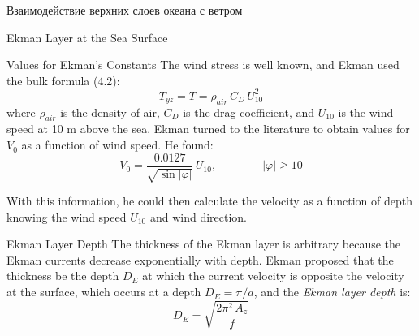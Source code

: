 \begin{chapter}{Взаимодействие верхних слоев океана с ветром}
\begin{section}{Ekman Layer at the Sea Surface}
\begin{paragraph}{Values for Ekman's Constants}
The wind stress is well known, and
Ekman used the bulk formula (4.2):
\begin{equation}
 T_{yz} = T = \rho_{air}\, C_D \,U_{10}^2
\end{equation}
where $\rho_{air}$ is the density of air, $C_D$ is the drag
coefficient, and $U_{10}$ is the wind speed at
10 m above the sea. Ekman turned to the literature to obtain values
for $V_0$ as a function of wind speed. He found:
\begin{equation}
 V_0 = \frac{0.0127}{\sqrt{\sin|\varphi|}}\, U_{10}, 
  \qquad \qquad |\varphi|\ge 10
\end{equation}
%

With this information, he could then calculate the velocity as a
function of depth knowing the wind speed $U_{10}$ and wind direction.
%
\end{paragraph}

\begin{paragraph}{Ekman Layer Depth}
The thickness of the Ekman layer is
arbitrary because the Ekman currents decrease exponentially with
depth. Ekman proposed that the thickness be the depth $D_E$ at which
the current velocity is opposite the velocity at the surface, which
occurs at a depth $D_E = \pi/a$, and the \textit{Ekman layer depth}
is:
\begin{equation}
 \boxed{D_E = \sqrt{\frac{2\pi^2\,A_z}{f}}}
\end{equation}
%


\end{paragraph}
\end{section}
\end{chapter}
